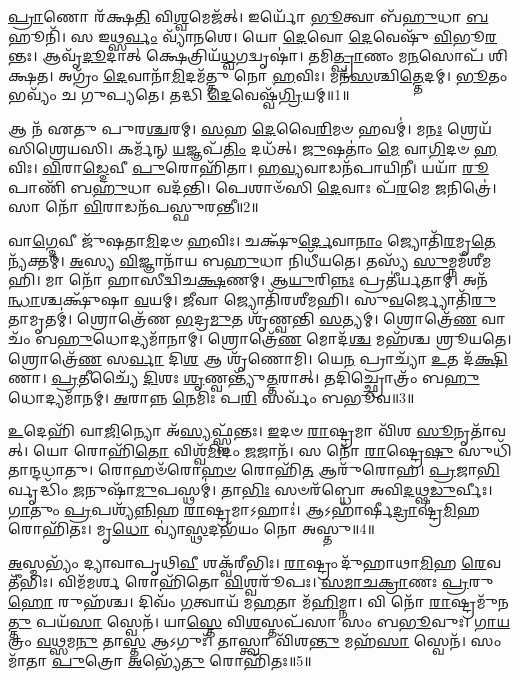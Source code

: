 \-\ul{𑌪𑍍𑌰𑌾}\-𑌣𑍋 𑌰᳴𑌕𑍍𑌷\-\ul{𑌤𑌿} 𑌵𑌿\-\ul{𑌶𑍍𑌵}\-𑌮𑍇𑌜᳴𑌤𑍍।
𑌇𑌰𑍍𑌯𑍋᳴ \ul{𑌭𑍂}\-𑌤𑍍𑌵𑌾 𑌬᳴\-\ul{𑌹𑍁}\-𑌧𑌾 \ul{𑌬}\-𑌹𑍂𑌨𑌿᳴।
𑌸 𑌇𑌥𑍍𑌸\-\ul{𑌰𑍍𑌵𑌂} 𑌵𑍍𑌯𑌾᳴𑌨𑌶𑍇।
𑌯𑍋 \ul{𑌦𑍇}\-𑌵𑍋 \ul{𑌦𑍇}\-𑌵𑍇𑌷𑍁᳴ \ul{𑌵𑌿}\-𑌭𑍂\-\ul{𑌰}\-𑌨𑍍𑌤𑌃।
𑌆𑌵𑍃᳴\-\ul{𑌦𑍂}\-𑌦𑌾𑌤𑍍 𑌕𑍍𑌷𑍇𑌤𑍍𑌰𑌿𑌯᳴\-\ul{𑌧𑍍𑌵}\-𑌗𑌦𑍍𑌵𑍃𑌷𑌾॑।
𑌤𑌮𑌿\-\ul{𑌤𑍍𑌪𑍍𑌰𑌾}\-𑌣𑌂 𑌮\-\ul{𑌨}\-𑌸𑍋𑌪᳴ 𑌶𑌿𑌕𑍍𑌷𑌤।
𑌅𑌗𑍍𑌰𑌂᳴ \ul{𑌦𑍇}\-𑌵𑌾𑌨𑌾᳴\-\ul{𑌮𑌿}\-𑌦𑌮᳴𑌤𑍍𑌤𑍁 𑌨𑍋 \ul{𑌹}\-𑌵𑌿𑌃।
𑌮𑌨᳴\-\ul{𑌸}\-𑌶𑍍𑌚𑌿\-\ul{𑌤𑍍𑌤𑍇}\-𑌦𑌮𑍍।
\-\ul{𑌭𑍂}\-𑌤𑌂 𑌭𑌵𑍍𑌯𑌂᳴ 𑌚 𑌗𑍁𑌪𑍍𑌯𑌤𑍇।
𑌤𑌦𑍍𑌧𑌿 \ul{𑌦𑍇}\-𑌵𑍇𑌷𑍍𑌵᳴\-\ul{𑌗𑍍𑌰𑌿}\-𑌯𑌮𑍍॥1॥

𑌆 𑌨᳴ 𑌏𑌤𑍁 𑌪𑍁𑌰\-\ul{𑌶𑍍𑌚}\-𑌰𑌮𑍍।
\-\ul{𑌸}\-𑌹 \ul{𑌦𑍇}\-𑌵𑍈\-\ul{𑌰𑌿}\-𑌮𑍞 𑌹𑌵𑌮𑍍॑।
𑌮\-\ul{𑌨𑌃} 𑌶𑍍𑌰𑍇𑌯᳴𑌸𑌿𑌶𑍍𑌰𑍇𑌯𑌸𑌿।
𑌕𑌰𑍍𑌮᳴𑌨𑍍 \ul{𑌯}\-𑌜𑍍𑌞𑌪᳴\-\ul{𑌤𑌿𑌂} 𑌦𑌧᳴𑌤𑍍।
\-\ul{𑌜𑍁}\-𑌷𑌤𑌾𑌂॑ \ul{𑌮𑍇} 𑌵𑌾\-\ul{𑌗𑌿}\-𑌦𑍞 \ul{𑌹}\-𑌵𑌿𑌃।
\-\ul{𑌵𑌿}\-𑌰𑌾\-\ul{𑌡𑍍𑌦𑍇}\-𑌵𑍀 \ul{𑌪𑍁}\-𑌰𑍋𑌹𑌿᳴𑌤𑌾।
\-\ul{𑌹}\-\-\ul{𑌵𑍍𑌯}\-𑌵𑌾𑌡𑌨᳴𑌪𑌾𑌯𑌿𑌨𑍀।
𑌯𑌯𑌾᳴ \ul{𑌰𑍂}\-𑌪𑌾𑌣𑌿᳴ 𑌬\-\ul{𑌹𑍁}\-𑌧𑌾 𑌵𑌦᳴𑌨𑍍𑌤𑌿।
𑌪𑍇𑌶𑌾𑍞᳴𑌸𑌿 \ul{𑌦𑍇}\-𑌵𑌾𑌃 𑌪᳴\-\ul{𑌰}\-𑌮𑍇 \ul{𑌜}\-𑌨𑌿𑌤𑍍𑌰𑍇॑।
𑌸𑌾 𑌨𑍋᳴ \ul{𑌵𑌿}\-𑌰𑌾𑌡𑌨᳴𑌪𑌸𑍍𑌫𑍁𑌰𑌨𑍍𑌤𑍀॥2॥

𑌵𑌾\-\ul{𑌗𑍍𑌦𑍇}\-𑌵𑍀 𑌜𑍁᳴𑌷𑌤𑌾\-\ul{𑌮𑌿}\-𑌦𑍞 \ul{𑌹}\-𑌵𑌿𑌃।
𑌚𑌕𑍍𑌷𑍁᳴\-\ul{𑌰𑍍𑌦𑍇}\-𑌵𑌾\-\ul{𑌨𑌾𑌂} 𑌜𑍍𑌯𑍋𑌤𑌿᳴\-\ul{𑌰}\-𑌮𑍃\-\ul{𑌤𑍇} 𑌨𑍍𑌯᳴𑌕𑍍𑌤𑌮𑍍।
\-\ul{𑌅}\-𑌸𑍍𑌯 \ul{𑌵𑌿}\-𑌜𑍍𑌞𑌾𑌨𑌾᳴𑌯 𑌬\-\ul{𑌹𑍁}\-𑌧𑌾 𑌨𑌿𑌧𑍀᳴𑌯𑌤𑍇।
𑌤𑌸𑍍𑌯᳴ \ul{𑌸𑍁}\-𑌮𑍍𑌨𑌮᳴𑌶𑍀𑌮𑌹𑌿।
𑌮𑌾 𑌨𑍋᳴ 𑌹𑌾𑌸𑍀𑌦𑍍𑌵𑌿𑌚\-\ul{𑌕𑍍𑌷}\-𑌣𑌮𑍍।
𑌆\-\ul{𑌯𑍁}\-𑌰𑌿\-\ul{𑌨𑍍𑌨𑌃} 𑌪𑍍𑌰𑌤𑍀॑𑌰𑍍𑌯𑌤𑌾𑌮𑍍।
𑌅𑌨᳴\-\ul{𑌨𑍍𑌧𑌾}\-𑌶𑍍𑌚𑌕𑍍𑌷𑍁᳴𑌷𑌾 \ul{𑌵}\-𑌯𑌮𑍍।
\-\ul{𑌜𑍀}\-𑌵𑌾 𑌜𑍍𑌯𑍋𑌤𑌿᳴𑌰𑌶𑍀𑌮𑌹𑌿।
𑌸𑍁\-\ul{𑌵}\-𑌰𑍍𑌜𑍍𑌯𑍋𑌤𑌿᳴\-\ul{𑌰𑍁}\-𑌤𑌾𑌮𑍃𑌤𑌮𑍍॑।
𑌶𑍍𑌰𑍋𑌤𑍍𑌰𑍇᳴𑌣 \ul{𑌭}\-𑌦𑍍𑌰\-\ul{𑌮𑍁}\-𑌤 𑌶𑍃᳴𑌣𑍍𑌵𑌨𑍍𑌤𑌿 \ul{𑌸}\-𑌤𑍍𑌯𑌮𑍍।
𑌶𑍍𑌰𑍋𑌤𑍍𑌰𑍇᳴\-\ul{𑌣} 𑌵𑌾𑌚𑌂᳴ 𑌬\-\ul{𑌹𑍁}\-𑌧𑍋𑌦𑍍𑌯𑌮𑌾᳴𑌨𑌾𑌮𑍍।
𑌶𑍍𑌰𑍋𑌤𑍍𑌰𑍇᳴\-\ul{𑌣} 𑌮𑍋𑌦᳴\-\ul{𑌶𑍍𑌚} 𑌮𑌹᳴𑌶𑍍𑌚 𑌶𑍍𑌰𑍂𑌯𑌤𑍇।
𑌶𑍍𑌰𑍋𑌤𑍍𑌰𑍇᳴\-\ul{𑌣} 𑌸\-\ul{𑌰𑍍𑌵𑌾} 𑌦𑌿\-\ul{𑌶} 𑌆 𑌶𑍃᳴𑌣𑍋𑌮𑌿।
𑌯𑍇\-\ul{𑌨} 𑌪𑍍𑌰𑌾𑌚𑍍𑌯𑌾᳴ \ul{𑌉}\-𑌤 𑌦᳴\-\ul{𑌕𑍍𑌷𑌿}\-𑌣𑌾।
\-\ul{𑌪𑍍𑌰}\-𑌤𑍀𑌚𑍍𑌯𑍈᳴ \ul{𑌦𑌿}\-𑌶𑌃 \ul{𑌶𑍃}\-𑌣𑍍𑌵𑌨𑍍𑌤𑍍𑌯𑍁᳴\-\ul{𑌤𑍍𑌤}\-𑌰𑌾𑌤𑍍।
𑌤𑌦𑌿𑌚𑍍𑌛𑍍𑌰𑍋𑌤𑍍𑌰𑌂᳴ 𑌬\-\ul{𑌹𑍁}\-𑌧𑍋𑌦𑍍𑌯𑌮𑌾᳴𑌨𑌮𑍍।
\-\ul{𑌅}\-𑌰𑌾𑌨𑍍𑌨 \ul{𑌨𑍇}\-𑌮𑌿𑌃 𑌪\-\ul{𑌰𑌿} 𑌸𑌰𑍍𑌵𑌂᳴ 𑌬𑌭𑍂𑌵॥3॥\anuvakamend[\-\ul{𑌅}\-\-\ul{𑌗𑍍𑌰𑌿}\-𑌯𑌮𑌨᳴𑌪𑌸𑍍𑌫𑍁𑌰𑌨𑍍𑌤𑍀 \ul{𑌸}\-𑌤𑍍𑌯𑍞 \ul{𑌸}\-𑌪𑍍𑌤 𑌚᳴]

\-\ul{𑌉}\-𑌦𑍇𑌹𑌿᳴ 𑌵𑌾\-\ul{𑌜𑌿}\-𑌨𑍍𑌯𑍋 𑌅᳴\-\ul{𑌸𑍍𑌯}\-𑌫𑍍𑌸𑍍𑌵᳴𑌨𑍍𑌤𑌃।
\-\ul{𑌇}\-𑌦𑍞 \ul{𑌰𑌾}\-𑌷𑍍𑌟𑍍𑌰𑌮𑌾 𑌵𑌿᳴𑌶 \ul{𑌸𑍂}\-𑌨𑍃𑌤𑌾᳴𑌵𑌤𑍍।
𑌯𑍋 𑌰𑍋𑌹𑌿᳴\-\ul{𑌤𑍋} 𑌵𑌿𑌶𑍍𑌵᳴\-\ul{𑌮𑌿}\-𑌦𑌂 \ul{𑌜}\-𑌜𑌾𑌨᳴।
𑌸 𑌨𑍋᳴ \ul{𑌰𑌾}\-𑌷𑍍𑌟𑍍𑌰𑍇\-\ul{𑌷𑍁} 𑌸𑍁𑌧𑌿᳴𑌤𑌾𑌨𑍍𑌦𑌧𑌾𑌤𑍁।
𑌰𑍋𑌹𑍞᳴𑌰𑍋\-\ul{𑌹}\-\-\ul{𑍞} 𑌰𑍋𑌹𑌿᳴\-\ul{𑌤} 𑌆𑌰𑍁᳴𑌰𑍋𑌹।
\-\ul{𑌪𑍍𑌰}\-𑌜𑌾\-\ul{𑌭𑌿}\-𑌰𑍍𑌵𑍃𑌦𑍍𑌧𑌿𑌂᳴ \ul{𑌜}\-𑌨𑍁𑌷𑌾᳴\-\ul{𑌮𑍁}\-𑌪𑌸𑍍𑌥𑌮𑍍॑।
𑌤𑌾\-\ul{𑌭𑌿𑌃} 𑌸𑍞𑌰᳴𑌬𑍍𑌧𑍋 𑌅𑌵𑌿\-\ul{𑌦}\-𑌥𑍍𑌷\-\ul{𑌡𑍁}\-𑌰𑍍𑌵𑍀𑌃।
\-\ul{𑌗𑌾}\-𑌤𑍁𑌂 \ul{𑌪𑍍𑌰}\-𑌪𑌶𑍍𑌯᳴\-\ul{𑌨𑍍𑌨𑌿}\-𑌹 \ul{𑌰𑌾}\-𑌷𑍍𑌟𑍍𑌰𑌮𑌾\-𑌽𑌹𑌾𑌃॑।
𑌆𑌽𑌹𑌾᳴𑌰𑍍\mbox{}𑌷𑍀\-\ul{𑌦𑍍𑌰𑌾}\-𑌷𑍍𑌟𑍍𑌰\-\ul{𑌮𑌿}\-𑌹 𑌰𑍋𑌹𑌿᳴𑌤𑌃।
𑌮𑍃\-\ul{𑌧𑍋} 𑌵𑍍𑌯𑌾॑\-\ul{𑌸𑍍𑌥}\-𑌦𑌭᳴𑌯𑌂 𑌨𑍋 𑌅𑌸𑍍𑌤𑍁॥4॥

\-\ul{𑌅}\-𑌸𑍍𑌮𑌭𑍍𑌯𑌂᳴ 𑌦𑍍𑌯𑌾𑌵𑌾𑌪𑍃𑌥𑌿\-\ul{𑌵𑍀} 𑌶𑌕𑍍𑌵᳴𑌰𑍀𑌭𑌿𑌃।
\-\ul{𑌰𑌾}\-𑌷𑍍𑌟𑍍𑌰𑌂 𑌦𑍁᳴𑌹𑌾𑌥𑌾\-\ul{𑌮𑌿}\-𑌹 \ul{𑌰𑍇}\-𑌵𑌤𑍀᳴𑌭𑌿𑌃।
𑌵𑌿𑌮᳴𑌮𑌰𑍍\mbox{}\-\ul{𑌶} 𑌰𑍋𑌹𑌿᳴𑌤𑍋 \ul{𑌵𑌿}\-𑌶𑍍𑌵𑌰𑍂᳴𑌪𑌃।
\-\ul{𑌸}\-\-\ul{𑌮𑌾}\-\-\ul{𑌚}\-\-\ul{𑌕𑍍𑌰𑌾}\-𑌣𑌃 \ul{𑌪𑍍𑌰}\-𑌰𑍁\-\ul{𑌹𑍋} 𑌰𑍁𑌹᳴𑌶𑍍𑌚।
𑌦𑌿𑌵𑌂᳴ \ul{𑌗}\-𑌤𑍍𑌵𑌾𑌯᳴ 𑌮\-\ul{𑌹}\-𑌤𑌾 𑌮᳴\-\ul{𑌹𑌿}\-𑌮𑍍𑌨𑌾।
𑌵𑌿 𑌨𑍋᳴ \ul{𑌰𑌾}\-𑌷𑍍𑌟𑍍𑌰𑌮𑍁᳴𑌨\-\ul{𑌤𑍍𑌤𑍁} 𑌪𑌯᳴\-\ul{𑌸𑌾} 𑌸𑍍𑌵𑍇𑌨᳴।
𑌯𑌾\-\ul{𑌸𑍍𑌤𑍇} 𑌵𑌿\-\ul{𑌶}\-𑌸𑍍𑌤𑌪᳴𑌸𑌾 𑌸𑌂 𑌬\-\ul{𑌭𑍂}\-𑌵𑍁𑌃।
\-\ul{𑌗𑌾}\-\-\ul{𑌯}\-𑌤𑍍𑌰𑌂 \ul{𑌵}\-𑌥𑍍𑌸𑌮\-\ul{𑌨𑍁} 𑌤𑌾\-\ul{𑌸𑍍𑌤} 𑌆𑌽𑌗𑍁𑌃᳴।
𑌤𑌾𑌸𑍍𑌤𑍍𑌵𑌾 𑌵𑌿᳴𑌶\-\ul{𑌨𑍍𑌤𑍁} 𑌮𑌹᳴\-\ul{𑌸𑌾} 𑌸𑍍𑌵𑍇𑌨᳴।
𑌸𑌂 𑌮𑌾᳴𑌤𑌾 \ul{𑌪𑍁}\-𑌤𑍍𑌰𑍋 \ul{𑌅}\-𑌭𑍍𑌯𑍇᳴\-\ul{𑌤𑍁} 𑌰𑍋𑌹𑌿᳴𑌤𑌃॥5॥

